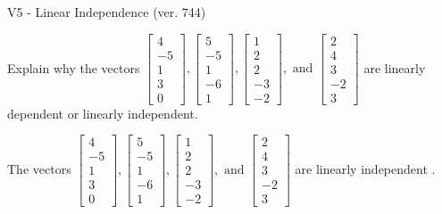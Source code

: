 \begin{exercise}
  \begin{exerciseTitle}V5 - Linear Independence (ver. 744)\end{exerciseTitle}
  \begin{exerciseStatement}
    Explain why the vectors \(\left[\begin{array}{r}
4 \\
-5 \\
1 \\
3 \\
0
\end{array}\right] , \left[\begin{array}{r}
5 \\
-5 \\
1 \\
-6 \\
1
\end{array}\right] , \left[\begin{array}{r}
1 \\
2 \\
2 \\
-3 \\
-2
\end{array}\right] , \text{ and } \left[\begin{array}{r}
2 \\
4 \\
3 \\
-2 \\
3
\end{array}\right]\) are linearly dependent or linearly independent.	


  \end{exerciseStatement}
  \begin{exerciseAnswer}
   The vectors \(\left[\begin{array}{r}
4 \\
-5 \\
1 \\
3 \\
0
\end{array}\right] , \left[\begin{array}{r}
5 \\
-5 \\
1 \\
-6 \\
1
\end{array}\right] , \left[\begin{array}{r}
1 \\
2 \\
2 \\
-3 \\
-2
\end{array}\right] , \text{ and } \left[\begin{array}{r}
2 \\
4 \\
3 \\
-2 \\
3
\end{array}\right]\) are 
  	 linearly independent  .
  


  \end{exerciseAnswer}
\end{exercise}